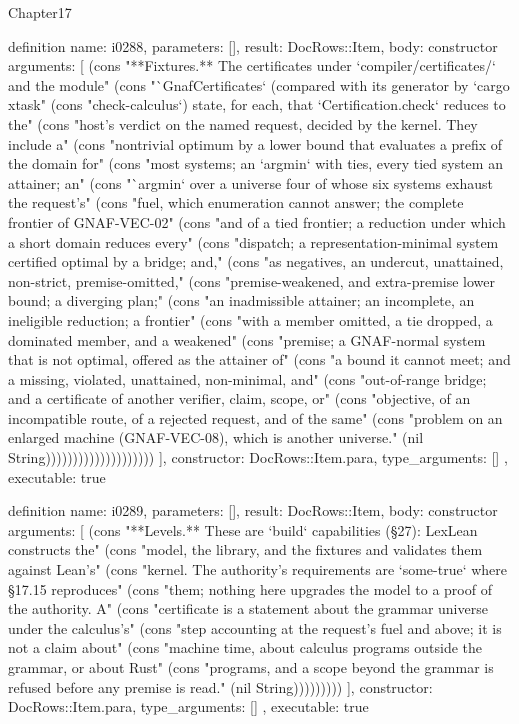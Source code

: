 \begin{lexlean}{Chapter17}
\begin{semanticmodule}
definition{
  name: i0288,
  parameters: [],
  result: DocRows::Item,
  body: constructor{
    arguments: [
      (cons "**Fixtures.** The certificates under `compiler/certificates/` and the module" (cons "`GnafCertificates` (compared with its generator by `cargo xtask" (cons "check-calculus`) state, for each, that `Certification.check` reduces to the" (cons "host's verdict on the named request, decided by the kernel. They include a" (cons "nontrivial optimum by a lower bound that evaluates a prefix of the domain for" (cons "most systems; an `argmin` with ties, every tied system an attainer; an" (cons "`argmin` over a universe four of whose six systems exhaust the request's" (cons "fuel, which enumeration cannot answer; the complete frontier of GNAF-VEC-02" (cons "and of a tied frontier; a reduction under which a short domain reduces every" (cons "dispatch; a representation-minimal system certified optimal by a bridge; and," (cons "as negatives, an undercut, unattained, non-strict, premise-omitted," (cons "premise-weakened, and extra-premise lower bound; a diverging plan;" (cons "an inadmissible attainer; an incomplete, an ineligible reduction; a frontier" (cons "with a member omitted, a tie dropped, a dominated member, and a weakened" (cons "premise; a GNAF-normal system that is not optimal, offered as the attainer of" (cons "a bound it cannot meet; and a missing, violated, unattained, non-minimal, and" (cons "out-of-range bridge; and a certificate of another verifier, claim, scope, or" (cons "objective, of an incompatible route, of a rejected request, and of the same" (cons "problem on an enlarged machine (GNAF-VEC-08), which is another universe." (nil String))))))))))))))))))))
    ],
    constructor: DocRows::Item.para,
    type_arguments: []
  },
  executable: true
}

definition{
  name: i0289,
  parameters: [],
  result: DocRows::Item,
  body: constructor{
    arguments: [
      (cons "**Levels.** These are `build` capabilities (§27): LexLean constructs the" (cons "model, the library, and the fixtures and validates them against Lean's" (cons "kernel. The authority's requirements are `some-true` where §17.15 reproduces" (cons "them; nothing here upgrades the model to a proof of the authority. A" (cons "certificate is a statement about the grammar universe under the calculus's" (cons "step accounting at the request's fuel and above; it is not a claim about" (cons "machine time, about calculus programs outside the grammar, or about Rust" (cons "programs, and a scope beyond the grammar is refused before any premise is read." (nil String)))))))))
    ],
    constructor: DocRows::Item.para,
    type_arguments: []
  },
  executable: true
}


\end{semanticmodule}
\end{lexlean}

